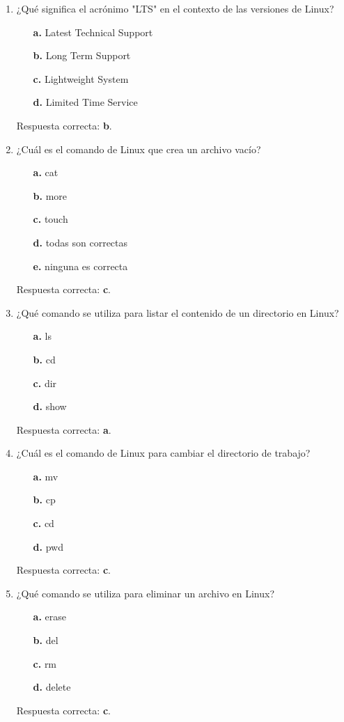 \documentclass[11pt,twoside]{book}
\begin{document}
\begin{enumerate}
    \item ¿Qué significa el acrónimo "LTS" en el contexto de las versiones de Linux?
    \begin{itemize}
        \item[\textbf{a.}] Latest Technical Support
        \item[\textbf{b.}] Long Term Support
        \item[\textbf{c.}] Lightweight System
        \item[\textbf{d.}] Limited Time Service
    \end{itemize}
    Respuesta correcta: \textbf{b}.

    \item ¿Cuál es el comando de Linux que crea un archivo vacío?
    \begin{itemize}
        \item[\textbf{a.}] cat
        \item[\textbf{b.}] more
        \item[\textbf{c.}] touch
        \item[\textbf{d.}] todas son correctas
        \item[\textbf{e.}] ninguna es correcta
    \end{itemize}
    Respuesta correcta: \textbf{c}.

    \item ¿Qué comando se utiliza para listar el contenido de un directorio en Linux?
    \begin{itemize}
        \item[\textbf{a.}] ls
        \item[\textbf{b.}] cd
        \item[\textbf{c.}] dir
        \item[\textbf{d.}] show
    \end{itemize}
    Respuesta correcta: \textbf{a}.

    \item ¿Cuál es el comando de Linux para cambiar el directorio de trabajo?
    \begin{itemize}
        \item[\textbf{a.}] mv
        \item[\textbf{b.}] cp
        \item[\textbf{c.}] cd
        \item[\textbf{d.}] pwd
    \end{itemize}
    Respuesta correcta: \textbf{c}.

    \item ¿Qué comando se utiliza para eliminar un archivo en Linux?
    \begin{itemize}
        \item[\textbf{a.}] erase
        \item[\textbf{b.}] del
        \item[\textbf{c.}] rm
        \item[\textbf{d.}] delete
    \end{itemize}
    Respuesta correcta: \textbf{c}.


\end{enumerate}
\end{document}
